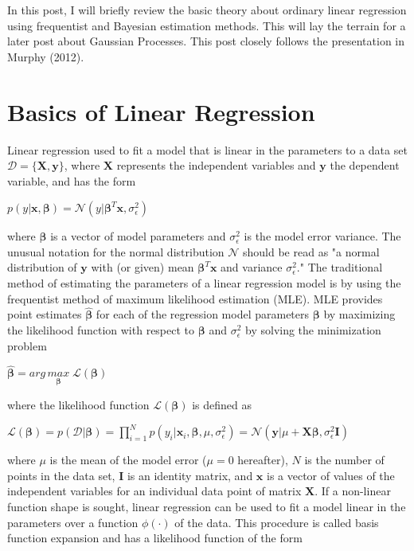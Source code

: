\documentclass[]{article}
\begin{document}
In this post, I will briefly review the basic theory about ordinary linear regression using frequentist and Bayesian estimation methods. This will lay the terrain for a later post about Gaussian Processes. This post closely follows the presentation in Murphy (2012).

\section{Basics of Linear Regression}

Linear regression used to fit a model that is linear in the parameters to a data set $\mathcal{D}=\{\boldsymbol{X},\boldsymbol{y}\}$, where $\boldsymbol{X}$ represents the independent variables and $\boldsymbol{y}$ the dependent variable, and has the form

$p(y|\boldsymbol{x}, \boldsymbol{\beta}) = \mathcal{N}(y|\boldsymbol{\beta}^T\boldsymbol{x}, \sigma_{\epsilon}^2)$

where $\boldsymbol{\beta}$ is a vector of model parameters and $\sigma_{\epsilon}^2$ is the model error variance. The unusual notation for the normal distribution $\mathcal{N}$ should be read as "a normal distribution of $\boldsymbol{y}$ with (or given) mean $\boldsymbol{\beta}^T\boldsymbol{x}$ and variance $\sigma_{\epsilon}^2$." The traditional method of estimating the parameters of a linear regression model is by using the frequentist method of maximum likelihood estimation (MLE). MLE provides point estimates $\boldsymbol{\hat{\beta}}$ for each of the regression model parameters $\boldsymbol{\beta}$ by maximizing the likelihood function with respect to $\boldsymbol{\beta}$ and $\sigma_{\epsilon}^2$ by solving the minimization problem

$\boldsymbol{\hat{\beta}} = arg\,\underset{\boldsymbol{\beta}}{max}\;\mathcal{L}(\boldsymbol{\beta})$

where the likelihood function $\mathcal{L}(\boldsymbol{\beta})$ is defined as

$\mathcal{L}(\boldsymbol{\beta})=p(\mathcal{D}|\boldsymbol{\beta})={\displaystyle \prod_{i=1}^{N} p(y_i|\boldsymbol{x}_i, \boldsymbol{\beta}, \mu, \sigma_{\epsilon}^2)} = \mathcal{N}(\boldsymbol{y}|\mu + \boldsymbol{X}\boldsymbol{\beta},\sigma_{\epsilon}^2\boldsymbol{I})$

where $\mu$ is the mean of the model error ($\mu=0$ hereafter), $N$ is the number of points in the data set, $\boldsymbol{I}$ is an identity matrix, and $\boldsymbol{x}$ is a vector of values of the independent variables for an individual data point of matrix $\boldsymbol{X}$. If a non-linear function shape is sought, linear regression can be used to fit a model linear in the parameters over a function $\phi(\cdot)$ of the data. This procedure is called basis function expansion and has a likelihood function of the form
\end{document}
